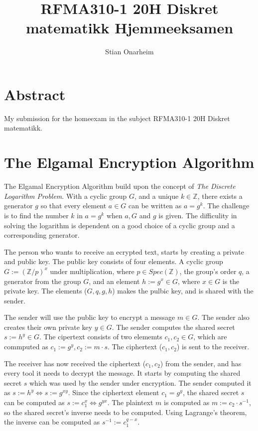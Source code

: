 \documentclass{article}
\author{Stian Onarheim}
\title{RFMA310-1 20H Diskret matematikk Hjemmeeksamen}
\begin{document}
\maketitle
\newpage
\tableofcontents
\newpage

\section{Abstract}
My submission for the homeexam in the subject RFMA310-1 20H Diskret matematikk.

\section{The Elgamal Encryption Algorithm}
The Elgamal Encryption Algorithm build upon the concept of \textit{The Discrete Logarithm Problem}. With a cyclic group $G$, and a unique $k \in \mathbb{Z}$, there exists a generator $g$ so that every element $a \in G$ can be written as $a = g^k$. The challenge is to find the number $k$ in $a = g^k$ when $a, G$ and $g$ is given. The difficulity in solving the logarithm is dependent on a good choice of a cyclic group and a corresponding generator.

The person who wants to receive an ecrypted text, starts by creating a private and public key. The public key consists of four elements. A cyclic group $G := (\mathbb{Z}/p)^x$ under multiplication, where $p \in Spec(\mathbb{Z})$, the group's order $q$, a generator from the group $G$, and an element $h := g^x \in G$, where $x \in G$ is the private key. The elements ($G, q, g, h$) makes the pulbic key, and is shared with the sender.

The sender will use the public key to encrypt a message $m \in G$. The sender also creates their own private key $y \in G$. The sender computes the shared secret $s := h^y \in G$. The cipertext consists of two elememts $c_1, c_2 \in G$, which are commputed as $c_1 := g^y, c_2 := m \cdot s$. The ciphertext ($c_1,c_2$) is sent to the receiver.

The receiver has now received the ciphertext ($c_1, c_2$) from the sender, and has every tool it needs to decrypt the message. It starts by computing the shared secret $s$ which was used by the sender under encryption. The sender computed it as $s := h^y \Leftrightarrow s:= g^{xy}$. Since the ciphertext element $c_1 = g^y$, the shared secret $s$ can be computed as $s := c_1^x \Leftrightarrow g^{yx}$. The plaintext $m$ is computed as $m := c_2 \cdot s^{-1}$, so the shared secret's inverse needs to be computed. Using Lagrange's theorem, the inverse can be computed as $s^{-1} := c_1^{q-x}$.
\end{document}
